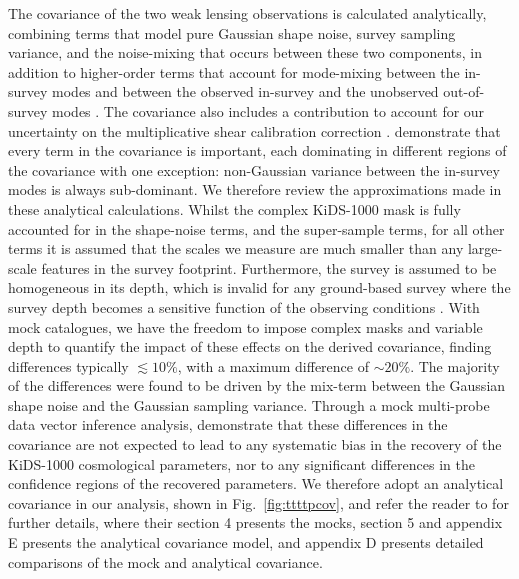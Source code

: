 The covariance of the two weak lensing observations is calculated analytically, combining terms that model pure Gaussian shape noise, survey sampling variance, and the noise-mixing that occurs between these two components, in addition to higher-order terms that account for mode-mixing between the in-survey modes and between the observed in-survey and the unobserved out-of-survey modes \citep[known as super-sample covariance,][]{takada/hu:2013}. 
The covariance also includes a contribution to account for our uncertainty on the multiplicative shear calibration correction \citep{kannawadi/etal:2019}. \citet{joachimi/etal:inprep} demonstrate that every term in the covariance is important, each dominating in different regions of the covariance with one exception: non-Gaussian variance between the in-survey modes is always sub-dominant.  We therefore review the approximations made in these analytical calculations.   
Whilst the complex KiDS-1000 mask is fully accounted for in the shape-noise terms, and the super-sample terms, for all other terms it is assumed that the scales we measure are much smaller than any large-scale features in the survey footprint. 
Furthermore, the survey is assumed to be homogeneous in its depth, which is invalid for any ground-based survey where the survey depth becomes a sensitive function of the observing conditions \citep{heydenreich/etal:2020}.   With mock catalogues, we have the freedom to impose complex masks and variable depth to quantify the impact of these effects on the derived covariance, finding differences typically $\lesssim 10\%$, with a maximum difference of $\sim\!20 \%$.  The majority of the differences were found to be driven by the mix-term between the Gaussian shape noise and the Gaussian sampling variance.    Through a mock multi-probe data vector inference analysis, \citet{joachimi/etal:inprep} demonstrate that these differences in the covariance are not expected to lead to any systematic bias in the recovery of the KiDS-1000 cosmological parameters, nor to any significant differences in the confidence regions of the recovered parameters.   We therefore adopt an analytical covariance in our analysis,  shown in Fig.~\ref{fig:ttttpcov}, and refer the reader to \citet{joachimi/etal:inprep} for further details, where their section 4 presents the mocks, section 5 and appendix E presents the analytical covariance model, and appendix D presents detailed comparisons of the mock and analytical covariance.

